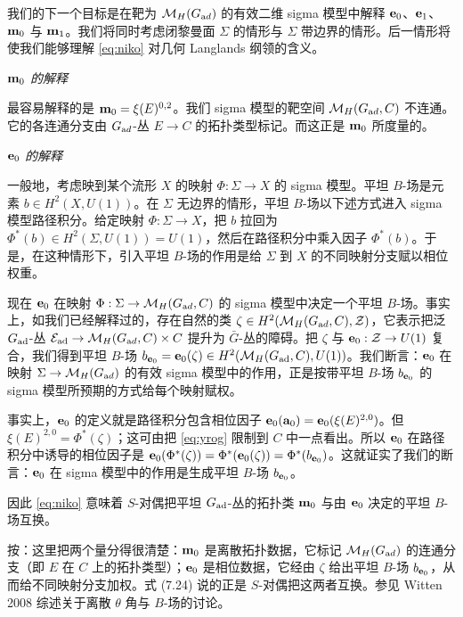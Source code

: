 我们的下一个目标是在靶为 $\MHAD$ 的有效二维 sigma 模型中解释 ${\bf e}_0$、${\bf e}_1$、${\bf m}_0$ 与 ${\bf m}_1$。我们将同时考虑闭黎曼面 $\Sigma$ 的情形与 $\Sigma$ 带边界的情形。后一情形将使我们能够理解 \eqref{eq:niko} 对几何 Langlands 纲领的含义。

\par\medskip\emph{${\bf m}_0$ 的解释}

最容易解释的是 ${\bf m}_0=\xi(E)^{0,2}$。我们 sigma 模型的靶空间 $\MH(G_{\rm ad},C)$ 不连通。它的各连通分支由 $G_{\rm ad}$-丛 $E\to C$ 的拓扑类型标记。而这正是 ${\bf m}_0$ 所度量的。

\par\medskip\emph{${\bf e}_0$ 的解释}

一般地，考虑映到某个流形 $X$ 的映射 $\Phi:\Sigma\to X$ 的 sigma 模型。平坦 $B$-场是元素 $b\in H^2(X,U(1))$。在 $\Sigma$ 无边界的情形，平坦 $B$-场以下述方式进入 sigma 模型路径积分。给定映射 $\Phi:\Sigma\to X$，把 $b$ 拉回为 $\Phi^*(b)\in H^2(\Sigma,U(1))=U(1)$，然后在路径积分中乘入因子 $\Phi^*(b)$。于是，在这种情形下，引入平坦 $B$-场的作用是给 $\Sigma$ 到 $X$ 的不同映射分支赋以相位权重。

现在 ${\bf e}_0$ 在映射 $\Phi:\Sigma\to \MH(G_{\rm ad},C)$ 的 sigma 模型中决定一个平坦 $B$-场。事实上，如我们已经解释过的，存在自然的类 $\zeta\in H^2(\MH(G_{\rm ad},C),\CZ)$，它表示把泛 $G_{\rm{ad}}$-丛 ${\EUE}_{\rm {ad}}\to\MH(G_{\rm ad},C)\times C$ 提升为 $\bar G$-丛的障碍。把 $\zeta$ 与 ${\bf e}_0:\CZ\to U(1)$ 复合，我们得到平坦 $B$-场 $b_{{\bf e}_0}={\bf e}_0(\zeta)\in H^2(\MH(G_{\rm{ad}},C),U(1))$。我们断言：${\bf e}_0$ 在映射 $\Sigma\to \MHAD$ 的有效 sigma 模型中的作用，正是按带平坦 $B$-场 $b_{{\bf e}_0}$ 的 sigma 模型所预期的方式给每个映射赋权。

事实上，${\bf e}_0$ 的定义就是路径积分包含相位因子 ${\bf e}_0({\bf a}_0)={\bf e}_0(\xi(E)^{2,0})$。但 $\xi(E)^{2,0}=\Phi^*(\zeta)$；这可由把 \eqref{eq:yrog} 限制到 $C$ 中一点看出。所以 ${\bf e}_0$ 在路径积分中诱导的相位因子是 ${\bf e}_0(\Phi^*(\zeta))=\Phi^*({\bf e}_0(\zeta))=\Phi^*(b_{{\bf e}_0})$。这就证实了我们的断言：${\bf e}_0$ 在 sigma 模型中的作用是生成平坦 $B$-场 $b_{{\bf e}_0}$。

因此 \eqref{eq:niko} 意味着 $S$-对偶把平坦 $G_{\rm{ad}}$-丛的拓扑类 ${\bf m}_0$ 与由 ${\bf e}_0$ 决定的平坦 $B$-场互换。

\begin{yizhu}[物理图像]
按：这里把两个量分得很清楚：${\bf m}_0$ 是离散拓扑数据，它标记 $\MHAD$ 的连通分支（即 $E$ 在 $C$ 上的拓扑类型）；${\bf e}_0$ 是相位数据，它经由 $\zeta$ 给出平坦 $B$-场 $b_{{\bf e}_0}$，从而给不同映射分支加权。式 (7.24) 说的正是 $S$-对偶把这两者互换。参见 Witten 2008 综述关于离散 $\theta$ 角与 $B$-场的讨论。
\end{yizhu}

